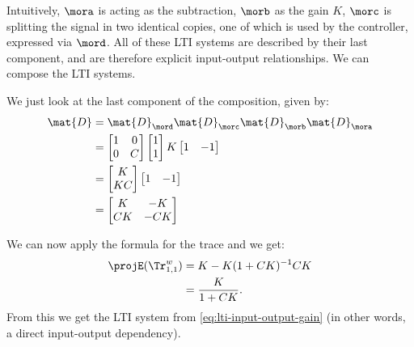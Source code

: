 {\begin{example}
        Intuitively, $\mora$ is acting as the subtraction, $\morb$ as the gain $K$, $\morc$ is splitting the signal in two identical copies, one of which is used by the controller, expressed via $\mord$.
        All of these LTI systems are described by their last component, and are therefore explicit input-output relationships.
        We can compose the LTI systems.
        
        
        We just look at the last component of the composition, given by:
        \begin{equation*}
            \begin{aligned}
                \mat{D} & =\mat{D}_\mord \mat{D}_\morc \mat{D}_\morb \mat{D}_\mora \\
                        & =\begin{bmatrix}1 & 0\\ 0 & {C}\end{bmatrix} \begin{bmatrix} 1\\ 1 \end{bmatrix} K \begin{bmatrix} 1 & -1 \end{bmatrix} \\
                        & =\begin{bmatrix}K \\ {KC}\end{bmatrix}\begin{bmatrix} 1 & -1 \end{bmatrix} \\
                        & =\begin{bmatrix}
                               K  & -K  \\
                               CK & -CK
                           \end{bmatrix}
            \end{aligned}
        \end{equation*}
        
        We can now apply the formula for the trace and we get:
        \begin{equation*}
            \begin{aligned}
                \projE(\Tr_{1,1}^{w}) & =K - K(1+CK)^{-1}CK \\
                                      & =\frac{K}{1+CK}.
            \end{aligned}
        \end{equation*}
        From this we get the LTI system from \cref{eq:lti-input-output-gain} (in other words, a direct input-output dependency).


\end{example}}
